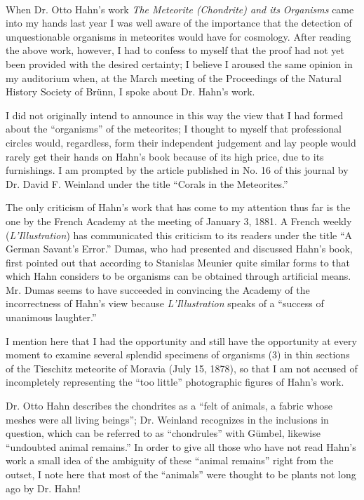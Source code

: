 \documentclass[a4paper, 12pt, oneside]{article}
\begin{document}
\paragraph*{}
When Dr. Otto Hahn's work \emph{The Meteorite (Chondrite) and its Organisms} came into my hands last year I was well aware of the importance that the detection of unquestionable organisms in meteorites would have for cosmology. After reading the above work, however, I had to confess to myself that the proof had not yet been provided with the desired certainty; I believe I aroused the same opinion in my auditorium when, at the March meeting of the Proceedings of the Natural History Society of Brünn, I spoke about Dr. Hahn's work.

I did not originally intend to announce in this way the view that I had formed about the ``organisms'' of the meteorites; I thought to myself that professional circles would, regardless, form their independent judgement and lay people would rarely get their hands on Hahn's book because of its high price, due to its furnishings. I am prompted by the article published in No. 16 of this journal by Dr. David F. Weinland under the title ``Corals in the Meteorites.''

The only criticism of Hahn's work that has come to my attention thus far is the one by the French Academy at the meeting of January 3, 1881. A French weekly (\emph{L'Illustration}) has communicated this criticism to its readers under the title ``A German Savant's Error.'' Dumas, who had presented and discussed Hahn's book, first pointed out that according to Stanislas Meunier quite similar forms to that which Hahn considers to be organisms can be obtained through artificial means. Mr. Dumas seems to have succeeded in convincing the Academy of the incorrectness of Hahn's view because \emph{L'Illustration} speaks of a ``success of unanimous laughter.''

I mention here that I had the opportunity and still have the opportunity at every moment to examine several splendid specimens of organisms (3) in thin sections of the Tieschitz meteorite of Moravia (July 15, 1878), so that I am not accused of incompletely representing the ``too little'' photographic figures of Hahn's work.

Dr. Otto Hahn describes the chondrites as a ``felt of animals, a fabric whose meshes were all living beings''; Dr. Weinland recognizes in the inclusions in question, which can be referred to as ``chondrules'' with Gümbel, likewise ``undoubted animal remains.'' In order to give all those who have not read Hahn's work a small idea of the ambiguity of these ``animal remains'' right from the outset, I note here that most of the ``animals'' were thought to be plants not long ago by Dr. Hahn!
\end{document}

